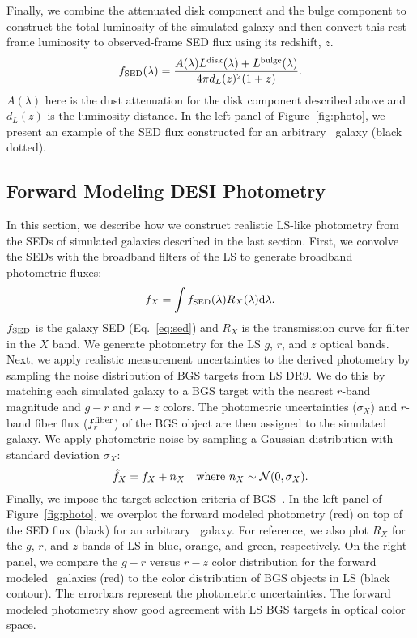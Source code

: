 Finally, we combine the attenuated disk component and the bulge component to
construct the total luminosity of the simulated galaxy and then convert this
rest-frame luminosity to observed-frame SED flux using its redshift, $z$.
\begin{equation}\label{eq:sed} 
    f_{\rm SED}(\lambda) = \frac{A(\lambda)L^{\rm disk}(\lambda) + L^{\rm bulge}(\lambda)}{4 \pi d_L(z)^2 (1+z)}.
\end{equation}
$A(\lambda)$ here is the dust attenuation for the disk component described
above and $d_L(z)$ is the luminosity distance.
In the left panel of Figure~\ref{fig:photo}, we present an example of the SED
flux constructed for an arbitrary \lgal~galaxy (black dotted).

\subsection{Forward Modeling DESI Photometry} \label{sec:photo} 
In this section, we describe how we construct realistic LS-like photometry
from the SEDs of simulated galaxies described in the last section.
First, we convolve the SEDs with the broadband filters of the LS to generate
broadband photometric fluxes: 
\begin{equation} \label{eq:photo}
    f_X = \int f_{\rm SED}(\lambda) R_X(\lambda) {\rm d}\lambda.
\end{equation}
$f_{\rm SED}$ is the galaxy SED (Eq.~\ref{eq:sed}) and $R_X$ is the
transmission curve for filter in the $X$ band. 
We generate photometry for the LS $g$, $r$, and $z$ optical bands.
Next, we apply realistic measurement uncertainties to the derived photometry by
sampling the noise distribution of BGS targets from LS DR9. 
We do this by matching each simulated galaxy to a BGS target with the nearest 
$r$-band magnitude and $g-r$ and $r-z$ colors.
The photometric uncertainties ($\sigma_X$) and $r$-band fiber flux ($f_r^{\rm
fiber}$) of the BGS object are then assigned to the simulated galaxy. 
We apply photometric noise by sampling a Gaussian distribution with standard
deviation $\sigma_X$: 
\begin{equation}
    \hat{f}_X = f_X + n_X  \quad {\rm where}~n_X \sim \mathcal{N}(0, \sigma_X).
\end{equation} 
Finally, we impose the target selection criteria of BGS~\citep[][Hahn~\etal~in
prep.]{ruiz-macias2021}.
In the left panel of Figure~\ref{fig:photo}, we overplot the forward
modeled photometry (red) on top of the SED flux (black) for an arbitrary
\lgal~galaxy. 
For reference, we also plot $R_X$ for the $g$, $r$, and $z$ bands of LS in
blue, orange, and green, respectively. 
On the right panel, we compare the $g - r$ versus $r - z$ color distribution
for the forward modeled \lgal~galaxies (red) to the color distribution of BGS
objects in LS (black contour). 
The errorbars represent the photometric uncertainties. 
The forward modeled photometry show good agreement with LS BGS targets in
optical color space.

